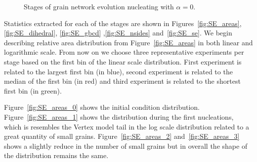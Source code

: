 \begin{figure}[ht]
{    \label{fig:SE_dist_2}
    }%
\caption{Stages of grain network evolution nucleating with $\alpha = 0$.}
    \label{fig:SE_evolution}
\end{figure}

Statistics extracted for each of the stages are shown in Figures~\ref{fig:SE_areas}, \ref{fig:SE_dihedral},  \ref{fig:SE_gbcd} ,\ref{fig:SE_nsides} and~\ref{fig:SE_se}.  We begin describing relative area distribution from Figure~\ref{fig:SE_areas} in both linear and logarithmic scale. From now on we choose three representative experiments per stage based on the first bin of the linear scale distribution. First experiment is related to the largest first bin (in blue), second experiment is related to the median of the first bin (in red) and third experiment is related to the shortest first bin (in green).

Figure~\ref{fig:SE_areas_0} shows the initial condition distribution. Figure~\ref{fig:SE_areas_1} shows the distribution during the first nucleations, which is resembles the Vertex model tail in the log scale distribution related to a great quantity of small grains. Figure~\ref{fig:SE_areas_2} and~\ref{fig:SE_areas_3} shows a slightly reduce in the number of small grains but in overall the shape of the distribution remains the same.

